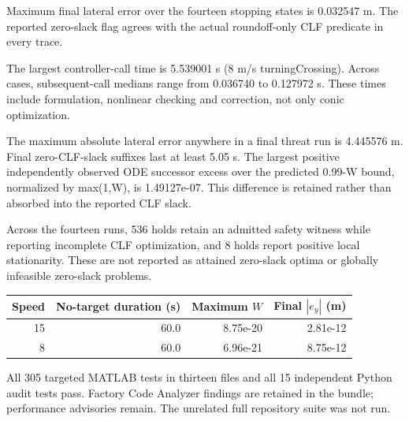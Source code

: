 Maximum final lateral error over the fourteen stopping states is 0.032547 m. The reported zero-slack flag agrees with the actual roundoff-only CLF predicate in every trace.

The largest controller-call time is 5.539001 s (8 m/s turningCrossing). Across cases, subsequent-call medians range from 0.036740 to 0.127972 s. These times include formulation, nonlinear checking and correction, not only conic optimization.

The maximum absolute lateral error anywhere in a final threat run is 4.445576 m. Final zero-CLF-slack suffixes last at least 5.05 s. The largest positive independently observed ODE successor excess over the predicted 0.99-W bound, normalized by max(1,W), is 1.49127e-07. This difference is retained rather than absorbed into the reported CLF slack.

Across the fourteen runs, 536 holds retain an admitted safety witness while reporting incomplete CLF optimization, and 8 holds report positive local stationarity. These are not reported as attained zero-slack optima or globally infeasible zero-slack problems.

\begin{center}\begin{tabular}{rrrr}\toprule Speed & No-target duration (s) & Maximum $W$ & Final $|e_y|$ (m) \\ \midrule

15 & 60.0 & 8.75e-20 & 2.81e-12 \\

8 & 60.0 & 6.96e-21 & 8.75e-12 \\

\bottomrule\end{tabular}\end{center}

All 305 targeted MATLAB tests in thirteen files and all 15 independent Python audit tests pass. Factory Code Analyzer findings are retained in the bundle; performance advisories remain. The unrelated full repository suite was not run.
